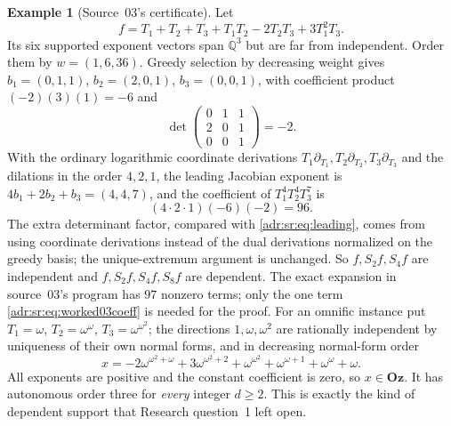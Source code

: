 \documentclass[11pt,letterpaper]{article}
\numberwithin{equation}{section}
\theoremstyle{definition}
\newtheorem{example}[example]{Example}
\theoremstyle{remark}
\newcommand{\Oz}{\mathbf{Oz}}
\newcommand{\Q}{\mathbb Q}
\begin{document}
\begin{example}[Source~03's certificate]
\label{adr:sr:ex:rank-three-03}
Let
\begin{equation}\label{adr:sr:eq:worked03}
 f=T_1+T_2+T_3+T_1T_2-2T_2T_3+3T_1^2T_3.
\end{equation}
Its six supported exponent vectors span $\Q^3$ but are far from independent.
Order them by $w=(1,6,36)$. Greedy selection by decreasing weight gives
$b_1=(0,1,1)$, $b_2=(2,0,1)$, $b_3=(0,0,1)$, with coefficient product
$(-2)(3)(1)=-6$ and
\[
 \det\begin{pmatrix}0&1&1\\2&0&1\\0&0&1\end{pmatrix}=-2.
\]
With the ordinary logarithmic coordinate derivations
$T_1\partial_{T_1},T_2\partial_{T_2},T_3\partial_{T_3}$ and the dilations in the
order $4,2,1$, the leading Jacobian exponent is $4b_1+2b_2+b_3=(4,4,7)$, and
the coefficient of $T_1^4T_2^4T_3^7$ is
\begin{equation}\label{adr:sr:eq:worked03coeff}
 (4\cdot2\cdot1)(-6)(-2)=96.
\end{equation}
The extra determinant factor, compared with \eqref{adr:sr:eq:leading}, comes
from using coordinate derivations instead of the dual derivations normalized
on the greedy basis; the unique-extremum argument is unchanged. So
$f,S_2f,S_4f$ are independent and $f,S_2f,S_4f,S_8f$ are dependent. The exact
expansion in source~03's program has $97$ nonzero terms; only the one term
\eqref{adr:sr:eq:worked03coeff} is needed for the proof. For an omnific
instance put $T_1=\omega$, $T_2=\omega^\omega$, $T_3=\omega^{\omega^2}$; the
directions $1,\omega,\omega^2$ are rationally independent by uniqueness of
their own normal forms, and in decreasing normal-form order
\begin{equation}\label{adr:sr:eq:worked03omnific}
 x=-2\omega^{\omega^2+\omega}+3\omega^{\omega^2+2}+\omega^{\omega^2}
   +\omega^{\omega+1}+\omega^\omega+\omega.
\end{equation}
All exponents are positive and the constant coefficient is zero, so
$x\in\Oz$. It has autonomous order three for \emph{every} integer $d\ge2$.
This is exactly the kind of dependent support that Research question~1 left
open.
\end{example}
\end{document}
